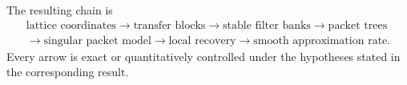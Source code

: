 \documentclass{aomart}
\theoremstyle{definition}
\theoremstyle{remark}
\begin{document}
The resulting chain is
\[
\begin{gathered}
\text{lattice coordinates}
\longrightarrow
\text{transfer blocks}
\longrightarrow
\text{stable filter banks}
\longrightarrow
\text{packet trees}
\\
\longrightarrow
\text{singular packet model}
\longrightarrow
\text{local recovery}
\longrightarrow
\text{smooth approximation rate}.
\end{gathered}
\]
Every arrow is exact or quantitatively controlled under the hypotheses stated in the corresponding result.




\end{document}

